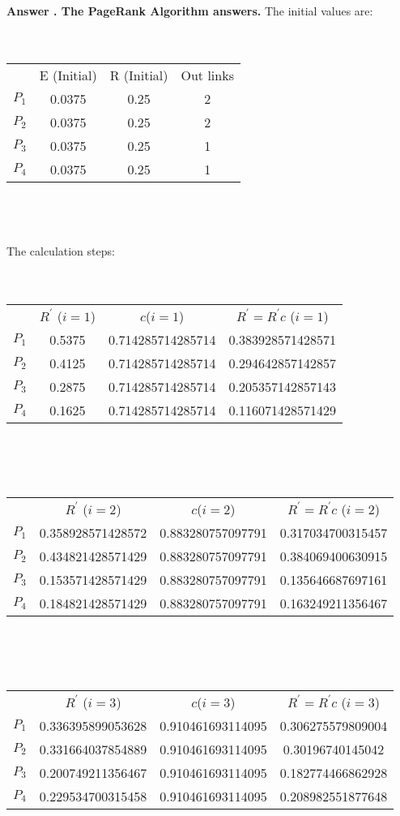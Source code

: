 \documentclass[paper=8.27in:11.69in, 14pt, DIV=calc]{scrartcl}
\newcounter{answers}
\newcommand\printanswers{\refstepcounter{answers}\theanswers}
\begin{document}
\textbf{\\Answer \printanswers . The PageRank Algorithm answers.} The initial values are:
\\
\\
\\
\begin{tabular}{cccc}
   & E (Initial) & R (Initial) & Out links \\
$P_{1}$ & 0.0375      & 0.25        & 2         \\
$P_{2}$ & 0.0375      & 0.25        & 2         \\
$P_{3}$ & 0.0375      & 0.25        & 1         \\
$P_{4}$ & 0.0375      & 0.25        & 1        
\end{tabular}
\\
\\
\\
The calculation steps:
\\
\\
\\
\begin{tabular}{cccc}
   & $R^{'}$ ($i=1$) & $c$($i=1$)           & $R^{'} = R^{'}c$ ($i=1$)      \\
$P_{1}$ & 0.5375   & 0.714285714285714 & 0.383928571428571 \\
$P_{2}$ & 0.4125   & 0.714285714285714 & 0.294642857142857 \\
$P_{3}$ & 0.2875   & 0.714285714285714 & 0.205357142857143 \\
$P_{4}$ & 0.1625   & 0.714285714285714 & 0.116071428571429
\end{tabular}
\\
\\
\\
\begin{tabular}{cccc}
   & $R^{'}$ ($i=2$)          & $c$($i=2$)           & $R^{'} = R^{'}c$ ($i=2$)      \\
$P_{1}$ & 0.358928571428572 & 0.883280757097791 & 0.317034700315457 \\
$P_{2}$ & 0.434821428571429 & 0.883280757097791 & 0.384069400630915 \\
$P_{3}$ & 0.153571428571429 & 0.883280757097791 & 0.135646687697161 \\
$P_{4}$ & 0.184821428571429 & 0.883280757097791 & 0.163249211356467
\end{tabular}
\\
\\
\\
\begin{tabular}{cccc}
   & $R^{'}$ ($i=3$)          & $c$($i=3$)           & $R^{'} = R^{'}c$ ($i=3$)      \\
$P_{1}$ & 0.336395899053628 & 0.910461693114095 & 0.306275579809004 \\
$P_{2}$ & 0.331664037854889 & 0.910461693114095 & 0.30196740145042  \\
$P_{3}$ & 0.200749211356467 & 0.910461693114095 & 0.182774466862928 \\
$P_{4}$ & 0.229534700315458 & 0.910461693114095 & 0.208982551877648
\end{tabular}
\end{document}
